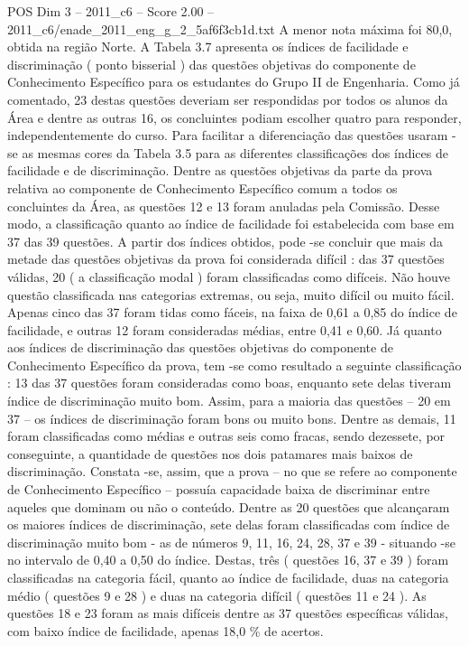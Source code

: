 \begin{textsample}{POS Dim 3 – 2011\_c6 – Score 2.00 – 2011\_c6/enade\_2011\_eng\_g\_2\_5af6f3cb1d.txt}
A menor nota máxima foi 80,0, obtida na região Norte.
A Tabela 3.7 apresenta os índices de facilidade e discriminação ( ponto bisserial ) das questões objetivas do componente de Conhecimento Específico para os estudantes do Grupo II de Engenharia.
Como já comentado, 23 destas questões deveriam ser respondidas por todos os alunos da Área e dentre as outras 16, os concluintes podiam escolher quatro para responder, independentemente do curso.
Para facilitar a diferenciação das questões usaram -se as mesmas cores da Tabela 3.5 para as diferentes classificações dos índices de facilidade e de discriminação.
Dentre as questões objetivas da parte da prova relativa ao componente de Conhecimento Específico comum a todos os concluintes da Área, as questões 12 e 13 foram anuladas pela Comissão.
Desse modo, a classificação quanto ao índice de facilidade foi estabelecida com base em 37 das 39 questões.
A partir dos índices obtidos, pode -se concluir que mais da metade das questões objetivas da prova foi considerada difícil : das 37 questões válidas, 20 ( a classificação modal ) foram classificadas como difíceis.
Não houve questão classificada nas categorias extremas, ou seja, muito difícil ou muito fácil.
Apenas cinco das 37 foram tidas como fáceis, na faixa de 0,61 a 0,85 do índice de facilidade, e outras 12 foram consideradas médias, entre 0,41 e 0,60.
Já quanto aos índices de discriminação das questões objetivas do componente de Conhecimento Específico da prova, tem -se como resultado a seguinte classificação : 13 das 37 questões foram consideradas como boas, enquanto sete delas tiveram índice de discriminação muito bom.
Assim, para a maioria das questões – 20 em 37 – os índices de discriminação foram bons ou muito bons.
Dentre as demais, 11 foram classificadas como médias e outras seis como fracas, sendo dezessete, por conseguinte, a quantidade de questões nos dois patamares mais baixos de discriminação.
Constata -se, assim, que a prova – no que se refere ao componente de Conhecimento Específico – possuía capacidade baixa de discriminar entre aqueles que dominam ou não o conteúdo.
Dentre as 20 questões que alcançaram os maiores índices de discriminação, sete delas foram classificadas com índice de discriminação muito bom - as de números 9, 11, 16, 24, 28, 37 e 39 - situando -se no intervalo de 0,40 a 0,50 do índice.
Destas, três ( questões 16, 37 e 39 ) foram classificadas na categoria fácil, quanto ao índice de facilidade, duas na categoria médio ( questões 9 e 28 ) e duas na categoria difícil ( questões 11 e 24 ).
As questões 18 e 23 foram as mais difíceis dentre as 37 questões específicas válidas, com baixo índice de facilidade, apenas 18,0 \% de acertos.

\end{textsample}
